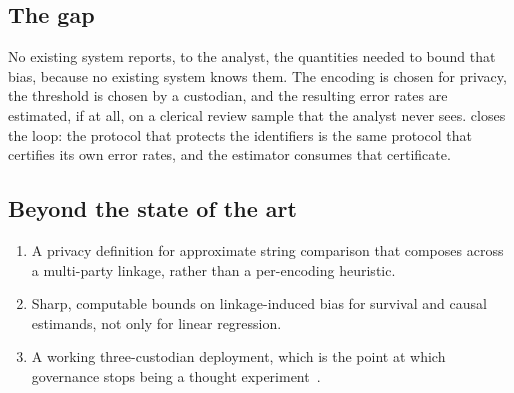 \subsection{The gap}

No existing system reports, to the analyst, the quantities needed to bound that bias, because no
existing system knows them. The encoding is chosen for privacy, the threshold is chosen by a
custodian, and the resulting error rates are estimated, if at all, on a clerical review sample that
the analyst never sees. \proj{} closes the loop: the protocol that protects the identifiers is the
same protocol that certifies its own error rates, and the estimator consumes that certificate.

\subsection{Beyond the state of the art}

\begin{enumerate}
  \item A privacy definition for approximate string comparison that composes across a multi-party
    linkage, rather than a per-encoding heuristic.
  \item Sharp, computable bounds on linkage-induced bias for survival and causal estimands, not
    only for linear regression.
  \item A working three-custodian deployment, which is the point at which governance stops being a
    thought experiment~\cite{vestergaardnnamdi2023governance}.
\end{enumerate}
